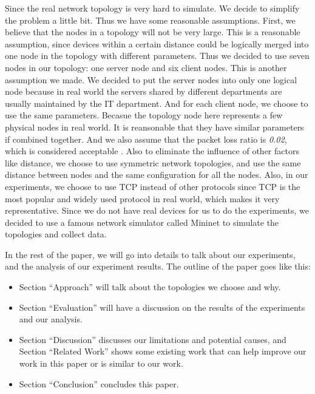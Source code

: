 Since the real network topology is very hard to simulate. 
We decide to simplify the problem a little bit. Thus we have some reasonable assumptions.
First, we believe that the nodes in a topology will not be very large. 
This is a reasonable assumption, since devices within a certain distance 
could be logically merged into one node in the topology with different parameters. 
Thus we decided to use seven nodes in our topology: 
one server node and six client nodes. This is another assumption we made. 
We decided to put the server nodes into only one logical node 
because in real world the servers shared by different departments are usually 
maintained by the IT department. And for each client node, we choose to use the same parameters. 
Becasue the topology node here represents a few physical nodes in real world. It is reansonable 
that they have similar parameters if combined together.
And we also assume that the packet loss ratio is \textit{0.02}, which is considered 
acceptable \cite{PacketLoss:wiki}. 
Also to eliminate the influence of other factors like distance, 
we choose to use symmetric network topologies, 
and use the same distance between nodes and the same configuration for all the nodes.
Also, in our experiments, we choose to use TCP instead of other protocols since TCP is the most 
popular and widely used protocol in real world, which makes it very representative. Since we do not 
have real devices for us to do the experiments, we decided to use a famous network simulator called
Mininet\cite{Mininet:official} to simulate the topologies and collect data.

In the rest of the paper, we will go into details to talk about our experiments, and the analysis 
of our experiment results. The outline of the paper goes like this:
\begin{itemize}
    \item Section ``Approach'' will talk about the topologies we choose and why.
    \item Section ``Evaluation'' will have a discussion on the results of the experiments and our analysis.
	\item Section ``Discussion'' discusses our limitations and potential
	causes, and Section ``Related Work'' shows some existing work that 
	can help improve our work in this paper or is similar to our work.
    \item Section ``Conclusion'' concludes this paper.
\end{itemize}

